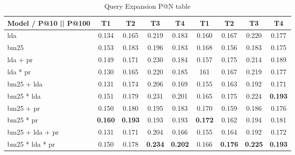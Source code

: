 \begin{table*}[h]
	\centering
	\caption{Query Expansion P@N table}
	\begin{tabular}{l|c|c|c|c||c|c|c|c}
		Model / P@10 || P@100 & T1 & T2 & T3 & T4 & T1 & T2 & T3 & T4\\
		\midrule
		\gls{lda} & 0.134 & 0.165 & 0.219 & 0.183 & 0.160 & 0.167 & 0.220 & 0.177 \\
		\gls{bm25} & 0.153 & 0.183 & 0.196 & 0.183 & 0.168 & 0.156 & 0.183 & 0.175 \\ 
		\gls{lda} + \gls{pr} & 0.149 & 0.171 & 0.230 & 0.184 & 0.157 & 0.175 & 0.214 & 0.189 \\
		\gls{lda} * \gls{pr} & 0.130 & 0.165 & 0.220 & 0.185 & 161 & 0.167 & 0.219 & 0.177 \\
		\gls{bm25} + \gls{lda} & 0.131 & 0.174 & 0.206 & 0.169 & 0.155 & 0.163 & 0.192 & 0.171 \\
		\gls{bm25} * \gls{lda} & 0.151 & 0.179 & 0.231 & 0.201 & 0.165 & 0.175 & 0.224 & \textbf{0.193} \\
		\gls{bm25} + \gls{pr} & 0.150 & 0.180 & 0.195 & 0.183 & 0.170 & 0.159 & 0.186 & 0.176 \\
		\gls{bm25} * \gls{pr} & \textbf{0.160} & \textbf{0.193} & 0.193 & 0.193 & \textbf{0.172} & 0.162 & 0.194 & 0.181 \\
		\gls{bm25} + \gls{lda} + \gls{pr} & 0.131 & 0.171 & 0.204 & 0.166 & 0.155 & 0.164 & 0.192 & 0.172 \\
		\gls{bm25} * \gls{lda} * \gls{pr} & 0.150 & 0.178 & \textbf{0.234} & \textbf{0.202} & 0.166 & \textbf{0.176} & \textbf{0.225} & \textbf{0.193} \\
	\end{tabular}
	\label{tab:expansion_results}
\end{table*}

